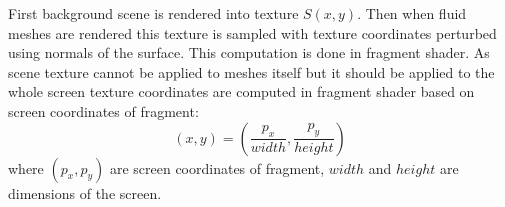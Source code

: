 First background scene is rendered into texture $S(x, y)$. Then when fluid meshes are rendered this texture is sampled with texture coordinates perturbed using normals of the surface. This computation is done in fragment shader. As scene texture cannot be applied to meshes itself but it should be applied to the whole screen texture coordinates are computed in fragment shader based on screen coordinates of fragment:
\begin{equation}
(x, y) = (\frac{p_x}{width}, \frac{p_y}{height})
\end{equation}
where $(p_x, p_y)$ are screen coordinates of fragment, $width$ and $height$ are dimensions of the screen. 
